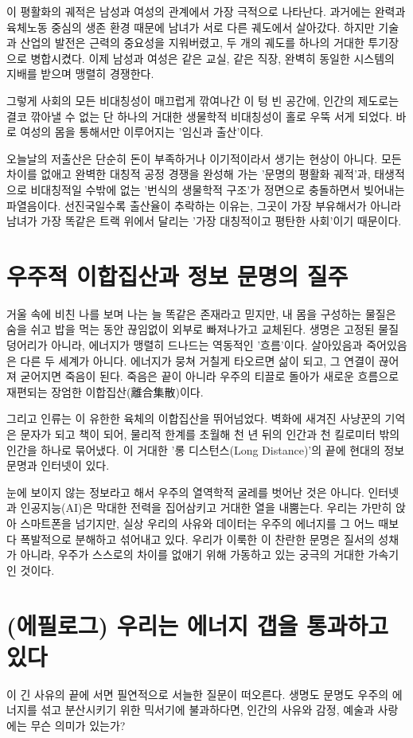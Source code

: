 \documentclass[12pt,a4paper]{article}
\begin{document}
이 평활화의 궤적은 남성과 여성의 관계에서 가장 극적으로 나타난다. 과거에는 완력과 육체노동 중심의 생존 환경 때문에 남녀가 서로 다른 궤도에서 살아갔다. 하지만 기술과 산업의 발전은 근력의 중요성을 지워버렸고, 두 개의 궤도를 하나의 거대한 투기장으로 병합시켰다. 이제 남성과 여성은 같은 교실, 같은 직장, 완벽히 동일한 시스템의 지배를 받으며 맹렬히 경쟁한다.

그렇게 사회의 모든 비대칭성이 매끄럽게 깎여나간 이 텅 빈 공간에, 인간의 제도로는 결코 깎아낼 수 없는 단 하나의 거대한 생물학적 비대칭성이 홀로 우뚝 서게 되었다. 바로 여성의 몸을 통해서만 이루어지는 '임신과 출산'이다.

오늘날의 저출산은 단순히 돈이 부족하거나 이기적이라서 생기는 현상이 아니다. 모든 차이를 없애고 완벽한 대칭적 공정 경쟁을 완성해 가는 '문명의 평활화 궤적'과, 태생적으로 비대칭적일 수밖에 없는 '번식의 생물학적 구조'가 정면으로 충돌하면서 빚어내는 파열음이다. 선진국일수록 출산율이 추락하는 이유는, 그곳이 가장 부유해서가 아니라 남녀가 가장 똑같은 트랙 위에서 달리는 '가장 대칭적이고 평탄한 사회'이기 때문이다.

\section{우주적 이합집산과 정보 문명의 질주}
거울 속에 비친 나를 보며 나는 늘 똑같은 존재라고 믿지만, 내 몸을 구성하는 물질은 숨을 쉬고 밥을 먹는 동안 끊임없이 외부로 빠져나가고 교체된다. 생명은 고정된 물질 덩어리가 아니라, 에너지가 맹렬히 드나드는 역동적인 '흐름'이다. 살아있음과 죽어있음은 다른 두 세계가 아니다. 에너지가 뭉쳐 거칠게 타오르면 삶이 되고, 그 연결이 끊어져 굳어지면 죽음이 된다. 죽음은 끝이 아니라 우주의 티끌로 돌아가 새로운 흐름으로 재편되는 장엄한 이합집산(離合集散)이다.

그리고 인류는 이 유한한 육체의 이합집산을 뛰어넘었다. 벽화에 새겨진 사냥꾼의 기억은 문자가 되고 책이 되어, 물리적 한계를 초월해 천 년 뒤의 인간과 천 킬로미터 밖의 인간을 하나로 묶어냈다. 이 거대한 '롱 디스턴스(Long Distance)'의 끝에 현대의 정보 문명과 인터넷이 있다.

눈에 보이지 않는 정보라고 해서 우주의 열역학적 굴레를 벗어난 것은 아니다. 인터넷과 인공지능(AI)은 막대한 전력을 집어삼키고 거대한 열을 내뿜는다. 우리는 가만히 앉아 스마트폰을 넘기지만, 실상 우리의 사유와 데이터는 우주의 에너지를 그 어느 때보다 폭발적으로 분해하고 섞어내고 있다. 우리가 이룩한 이 찬란한 문명은 질서의 성채가 아니라, 우주가 스스로의 차이를 없애기 위해 가동하고 있는 궁극의 거대한 가속기인 것이다.

\section{(에필로그) 우리는 에너지 갭을 통과하고 있다}
이 긴 사유의 끝에 서면 필연적으로 서늘한 질문이 떠오른다. 생명도 문명도 우주의 에너지를 섞고 분산시키기 위한 믹서기에 불과하다면, 인간의 사유와 감정, 예술과 사랑에는 무슨 의미가 있는가?
\end{document}
